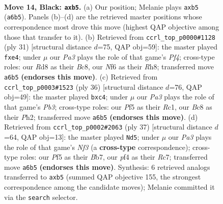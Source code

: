 \documentclass[11pt]{article}
\begin{document}
\clearpage

\begin{figure}[p]\centering
\begin{subfigure}{0.46\textwidth}\centering
\resizebox{\linewidth}{!}{%
\newchessgame
\chessboard[
  setfen={r1br2k1/1pp3bp/p4np1/1P3p2/P1P1pP1P/6P1/4P1B1/RNB2RK1 b - - 0 14},
  showmover=false,
  pgfstyle=straightmove, color=movearrow, markmove={a6-b5}
]}
\caption{}
\end{subfigure}\hfill
\begin{subfigure}{0.46\textwidth}\centering
\resizebox{\linewidth}{!}{%
\newchessgame
\chessboard[
  setfen={r1b1k2r/pp2p2p/1n1p2p1/2pP1p2/2P1P3/2P3P1/P2B1PBP/R3R1K1 b kq - 0 16},
  showmover=false,
  pgfstyle=straightmove, color=movearrow, markmove={f5-e4}
]}
\caption{}
\end{subfigure}
\\[4pt]
\begin{subfigure}{0.46\textwidth}\centering
\resizebox{\linewidth}{!}{%
\newchessgame
\chessboard[
  setfen={2r1r1k1/pb3ppp/np1b4/3p4/P1pP4/1PB1PNP1/5PBP/2RR2K1 w - - 0 19},
  showmover=false,
  pgfstyle=straightmove, color=movearrow, markmove={b3-c4}
]}
\caption{}
\end{subfigure}\hfill
\begin{subfigure}{0.46\textwidth}\centering
\resizebox{\linewidth}{!}{%
\newchessgame
\chessboard[
  setfen={4k2r/1brp1pp1/p3pn2/4P2p/Pp3P2/1N1B4/1PP3PP/1K1RR3 b k - 0 19},
  showmover=false,
  pgfstyle=straightmove, color=movearrow, markmove={f6-d5}
]}
\caption{}
\end{subfigure}
\caption{\textbf{Move 14, Black: \texttt{axb5}.} (a) Our position; Melanie plays \texttt{axb5} (\texttt{a6b5}). Panels (b)--(d) are the retrieved master positions whose correspondence most drove this move (highest QAP objective among those that transfer to it). (b) Retrieved from \texttt{ccrl\_top\_p0000\#1128} (ply 31) [structural distance $d$=75, QAP obj=59]: the master played \texttt{fxe4}; under $\mu$ our \emph{Pa3} plays the role of that game's \emph{Pf4}; cross-type roles: our \emph{R}d8 as their \emph{B}c8, our \emph{N}f6 as their \emph{R}h8; transferred move \texttt{a6b5} \textbf{(endorses this move)}. (c) Retrieved from \texttt{ccrl\_top\_p0003\#1523} (ply 36) [structural distance $d$=76, QAP obj=49]: the master played \texttt{bxc4}; under $\mu$ our \emph{Pa3} plays the role of that game's \emph{Pb3}; cross-type roles: our \emph{P}f5 as their \emph{R}c1, our \emph{B}c8 as their \emph{P}h2; transferred move \texttt{a6b5} \textbf{(endorses this move)}. (d) Retrieved from \texttt{ccrl\_top\_p0002\#2063} (ply 37) [structural distance $d$=64, QAP obj=13]: the master played \texttt{Nd5}; under $\mu$ our \emph{Pa3} plays the role of that game's \emph{Nf3} (a \textbf{cross-type} correspondence); cross-type roles: our \emph{P}f5 as their \emph{B}b7, our \emph{p}f4 as their \emph{R}c7; transferred move \texttt{a6b5} \textbf{(endorses this move)}. Synthesis: 6 retrieved analogs transferred to \texttt{axb5} (summed QAP objective 155, the strongest correspondence among the candidate moves); Melanie committed it via the \texttt{search} selector.}
\label{fig:thought-m27}
\end{figure}
\end{document}
